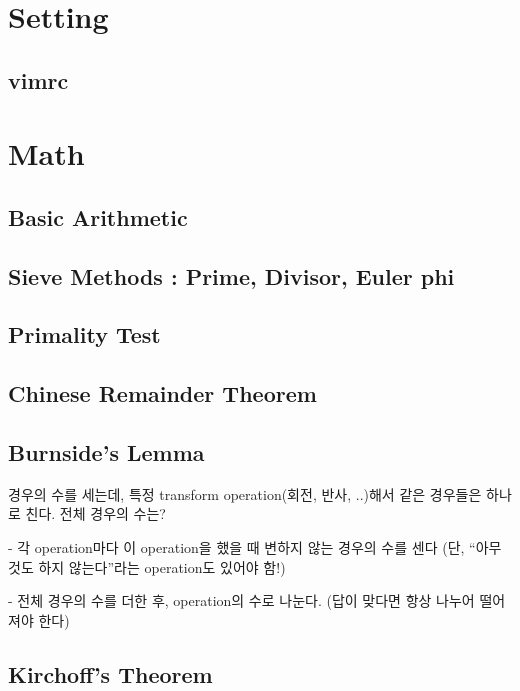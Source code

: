 \documentclass[10pt,landscape,a4paper,twocolumn]{article}
\begin{document}
\tableofcontents


\section{Setting}

\subsection{vimrc}



\section{Math}

\subsection{Basic Arithmetic}


\subsection{Sieve Methods : Prime, Divisor, Euler phi}


\subsection{Primality Test}


\subsection{Chinese Remainder Theorem}


\subsection{Burnside's Lemma}

경우의 수를 세는데, 특정 transform operation(회전, 반사, ..)해서 같은 경우들은 하나로 친다.
전체 경우의 수는?

- 각 operation마다 이 operation을 했을 때 변하지 않는 경우의 수를 센다
(단, ``아무것도 하지 않는다''라는 operation도 있어야 함!)

- 전체 경우의 수를 더한 후, operation의 수로 나눈다. (답이 맞다면 항상 나누어 떨어져야 한다)

\subsection{Kirchoff's Theorem}
\end{document}
